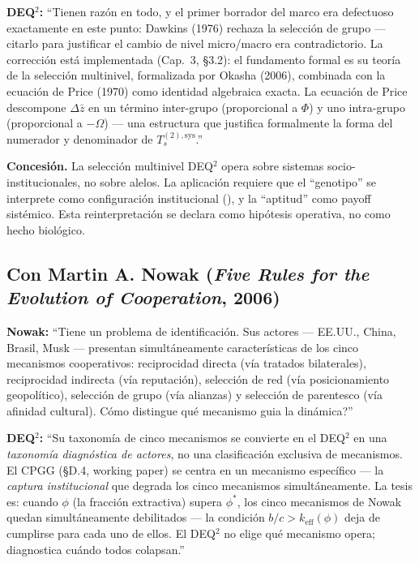 \textbf{DEQ$^2$:} ``Tienen raz\'{o}n en todo, y el primer borrador del
marco era defectuoso exactamente en este punto: Dawkins (1976) rechaza la
selecci\'{o}n de grupo --- citarlo para justificar el cambio de nivel
micro/macro era contradictorio. La correcci\'{o}n est\'{a} implementada
(Cap.~3, §3.2): el fundamento formal es su teor\'{i}a de la selecci\'{o}n
multinivel, formalizada por Okasha (2006), combinada con la ecuaci\'{o}n
de Price (1970) como identidad algebraica exacta. La ecuaci\'{o}n de Price
descompone $\Delta\bar{z}$ en un t\'{e}rmino inter-grupo (proporcional a
$\Phi$) y uno intra-grupo (proporcional a $-\Omega$) --- una estructura que
justifica formalmente la forma del numerador y denominador de
$T_s^{(2),\text{sys}}$.''

\textbf{Concesi\'{o}n.} La selecci\'{o}n multinivel DEQ$^2$ opera sobre
sistemas socio-institucionales, no sobre alelos. La aplicaci\'{o}n requiere
que el ``genotipo'' se interprete como configuraci\'{o}n institucional
(\Hypoth{}), y la ``aptitud'' como payoff sist\'{e}mico. Esta
reinterpretaci\'{o}n se declara como hip\'{o}tesis operativa, no como
hecho biol\'{o}gico.

\subsection{Con Martin A. Nowak (\emph{Five Rules for the Evolution of
Cooperation}, 2006)}\label{con-nowak-2006}

\textbf{Nowak:} ``Tiene un problema de identificaci\'{o}n. Sus actores ---
EE.UU., China, Brasil, Musk --- presentan simult\'{a}neamente
caracter\'{i}sticas de los cinco mecanismos cooperativos: reciprocidad
directa (v\'{i}a tratados bilaterales), reciprocidad indirecta (v\'{i}a
reputaci\'{o}n), selecci\'{o}n de red (v\'{i}a posicionamiento
geopol\'{i}tico), selecci\'{o}n de grupo (v\'{i}a alianzas) y selecci\'{o}n
de parentesco (v\'{i}a afinidad cultural). \textquestiondown C\'{o}mo
distingue qu\'{e} mecanismo guia la din\'{a}mica?''

\textbf{DEQ$^2$:} ``Su taxonom\'{i}a de cinco mecanismos se convierte en
el DEQ$^2$ en una \emph{taxonom\'{i}a diagn\'{o}stica de actores}, no una
clasificaci\'{o}n exclusiva de mecanismos. El CPGG (§D.4, working paper)
se centra en un mecanismo espec\'{i}fico --- la \emph{captura
institucional} que degrada los cinco mecanismos simult\'{a}neamente. La
tesis es: cuando $\phi$ (la fracci\'{o}n extractiva) supera $\phi^*$,
los cinco mecanismos de Nowak quedan simult\'{a}neamente debilitados ---
la condici\'{o}n $b/c > k_{\text{eff}}(\phi)$ deja de cumplirse para cada
uno de ellos. El DEQ$^2$ no elige qu\'{e} mecanismo opera; diagnostica
cu\'{a}ndo todos colapsan.''

